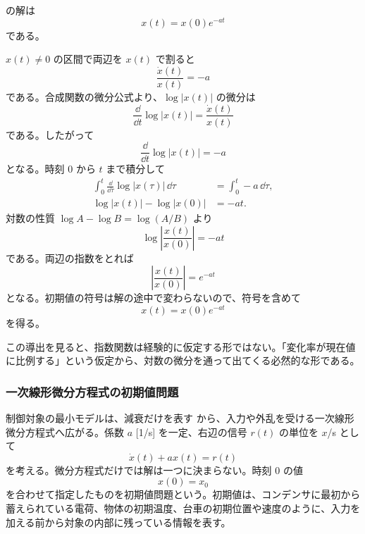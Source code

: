 \begin{theorem}[一次の同次線形微分方程式の解]
 の解は
\begin{equation}
  x(t)=x(0)e^{-at}
  \label{eq:basic-decay-solution}
\end{equation}
である。
\end{theorem}

\begin{derivation}
$x(t)\ne0$ の区間で両辺を $x(t)$ で割ると
\begin{equation}
  \frac{\dot{x}(t)}{x(t)}=-a
\end{equation}
である。合成関数の微分公式より、$\log |x(t)|$ の微分は
\begin{equation}
  \frac{\dd}{\dd t}\log |x(t)|=\frac{\dot{x}(t)}{x(t)}
\end{equation}
である。したがって
\begin{equation}
  \frac{\dd}{\dd t}\log |x(t)|=-a
\end{equation}
となる。時刻 $0$ から $t$ まで積分して
\begin{align}
  \int_0^t\frac{\dd}{\dd \tau}\log |x(\tau)|\,\dd\tau
  &=\int_0^t -a\,\dd\tau,\\
  \log |x(t)|-\log |x(0)|&=-at.
\end{align}
対数の性質 $\log A-\log B=\log(A/B)$ より
\begin{equation}
  \log \left|\frac{x(t)}{x(0)}\right|=-at
\end{equation}
である。両辺の指数をとれば
\begin{equation}
  \left|\frac{x(t)}{x(0)}\right|=e^{-at}
\end{equation}
となる。初期値の符号は解の途中で変わらないので、符号を含めて
\begin{equation}
  x(t)=x(0)e^{-at}
\end{equation}
を得る。
\end{derivation}

この導出を見ると、指数関数は経験的に仮定する形ではない。「変化率が現在値に比例する」という仮定から、対数の微分を通って出てくる必然的な形である。

\subsubsection{一次線形微分方程式の初期値問題}

制御対象の最小モデルは、減衰だけを表す  から、入力や外乱を受ける一次線形微分方程式へ広がる。係数 $a$ [1/s] を一定、右辺の信号 $r(t)$ の単位を $x$/s として
\begin{equation}
  \dot{x}(t)+a x(t)=r(t)
  \label{eq:first-order-linear-ivp}
\end{equation}
を考える。微分方程式だけでは解は一つに決まらない。時刻 $0$ の値
\begin{equation}
  x(0)=x_0
  \label{eq:first-order-linear-initial}
\end{equation}
を合わせて指定したものを初期値問題という。初期値は、コンデンサに最初から蓄えられている電荷、物体の初期温度、台車の初期位置や速度のように、入力を加える前から対象の内部に残っている情報を表す。

